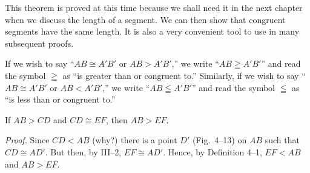 \documentclass[11pt]{book}
\begin{document}
\medskip
This theorem is proved at this time because we shall need it in the next chapter
when we discuss the length of a segment. We can then show that congruent segments
have the same length. It is also a very convenient tool to use in many subsequent
proofs.

\FIGIVTWELVETHIRTEEN

\begin{definition}
If we wish to say ``$AB \cong A'B'$ or $AB > A'B'$,'' we write
``$AB \geqq A'B'$'' and read the symbol $\geqq$ as ``is greater than or
congruent to.'' Similarly, if we wish to say ``$AB \cong A'B'$ or
$AB < A'B'$,'' we write ``$AB \leqq A'B'$'' and read the symbol $\leqq$ as ``is
less than or congruent to.''
\end{definition}

\begin{theorem}
If $AB > CD$ and $CD \cong EF$, then $AB > EF$.
\end{theorem}

\noindent\emph{Proof.} Since $CD < AB$ (why?) there is a point $D'$
(Fig.~4--13) on $AB$ such that $CD \cong AD'$. But then, by III--2,
$EF \cong AD'$. Hence, by Definition 4--1, $EF < AB$ and $AB > EF$.

\end{document}
